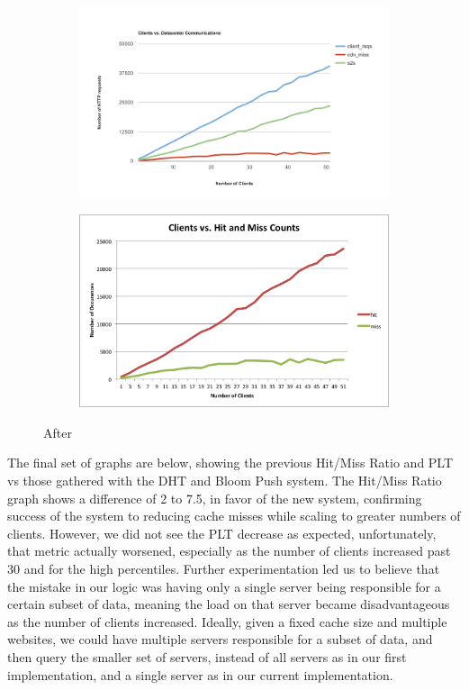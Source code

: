 \documentclass[conference]{IEEEtran}
\begin{document}
\begin{figure}[!h]
	\centering
	\begin{subfigure}[b]{0.49\columnwidth}
		\centering
		\includegraphics[width=\columnwidth]{figures/client-server_1.png}
	\end{subfigure}
	\begin{subfigure}[b]{0.49\columnwidth}
		\centering
		\includegraphics[width=\columnwidth]{figures/hit_miss_separate_1.png}
	\end{subfigure}
	\caption{After}
\end{figure}

The final set of graphs are below, showing the previous Hit/Miss Ratio and PLT vs those gathered with the DHT and Bloom Push system. The Hit/Miss Ratio graph shows a difference of 2 to 7.5, in favor of the new system, confirming success of the system to reducing cache misses while scaling to greater numbers of clients. However, we did not see the PLT decrease as expected, unfortunately, that metric actually worsened, especially as the number of clients increased past 30 and for the high percentiles. Further experimentation led us to believe that the mistake in our logic was having only a single server being responsible for a certain subset of data, meaning the load on that server became disadvantageous as the number of clients increased. Ideally, given a fixed cache size and multiple websites, we could have multiple servers responsible for a subset of data, and then query the smaller set of servers, instead of all servers as in our first implementation, and a single server as in our current implementation. 
\end{document}
